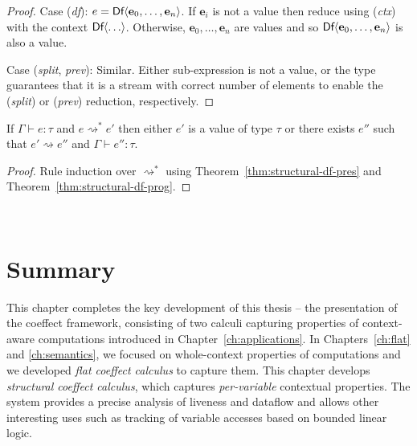 \begin{proof}
\vspace{0.25em}\noindent\hangindent=0.6cm
Case (\emph{df}): $e = \ident{Df}\langle \textbf{e}_0, \ldots, \textbf{e}_n\rangle$. If $\textbf{e}_i$ is not a value
  then reduce using (\emph{ctx}) with the context $\textnormal{\sffamily Df}\langle \ldots \rangle$.
  Otherwise, $\textbf{e}_0, \ldots, \textbf{e}_n$ are values and so $\textnormal{\sffamily Df}\langle \textbf{e}_0, \ldots, \textbf{e}_n\rangle$
  is also a value.

\vspace{0.25em}\noindent\hangindent=0.6cm
Case (\emph{split}, \emph{prev}): Similar. Either sub-expression is not a value, or the type
  guarantees that it is a stream with correct number of elements to enable the (\emph{split})
  or (\emph{prev}) reduction, respectively.
\end{proof}

\begin{theorem}
  If $\Gamma \vdash e : \tau$ and $e \rightsquigarrow^{*} e'$ then either $e'$ is a value of type $\tau$ or
  there exists $e''$ such that $e' \rightsquigarrow e''$ and $\Gamma \vdash e'' : \tau$.
\end{theorem}
\begin{proof}
  Rule induction over $\rightsquigarrow^*$ using Theorem~\ref{thm:structural-df-pres} and Theorem~\ref{thm:structural-df-prog}.
\end{proof}


%
%

~

\section{Summary}

This chapter completes the key development of this thesis -- the presentation of the coeffect
framework, consisting of two calculi capturing properties of context-aware computations introduced
in Chapter~\ref{ch:applications}. In Chapters~\ref{ch:flat} and \ref{ch:semantics}, we focused on
whole-context properties of computations and we developed \emph{flat coeffect calculus} to capture them.
This chapter develops \emph{structural coeffect calculus}, which captures \emph{per-variable}
contextual properties. The system provides a precise analysis of liveness and dataflow and allows
other interesting uses such as tracking of variable accesses based on bounded linear logic.

